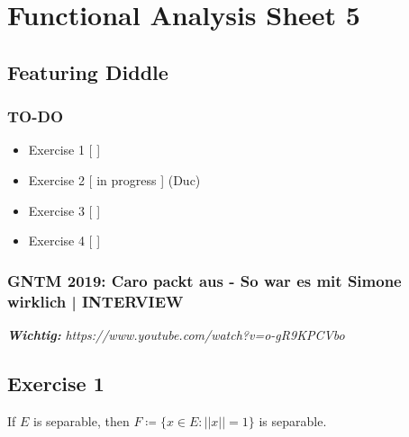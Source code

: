\documentclass[a4paper]{article}
\renewcommand{\hline}{\noindent\makebox[\linewidth]{\rule{12cm}{1pt}}}
\newcommand{\vip}[1]{\textit{\textbf{#1}}}
\begin{document}

\section*{Functional Analysis Sheet 5}
\subsection*{Featuring Diddle}

\subsubsection*{TO-DO}
\begin{itemize}
    \item Exercise 1 [ ]
    \item Exercise 2 [ in progress ] (Duc)
    \item Exercise 3 [ ]
    \item Exercise 4 [ ]
\end{itemize}

\subsubsection*{GNTM 2019: Caro packt aus - So war es mit Simone wirklich | INTERVIEW}

\vip{Wichtig:} \emph{https://www.youtube.com/watch?v=o-gR9KPCVbo}

\hline

\subsection*{Exercise 1}
\begin{issue}{}{}
If $E$ is separable, then $F \coloneqq \{ x \in E: ||x|| =1 \}$ is separable.
\end{issue}
\end{document}
